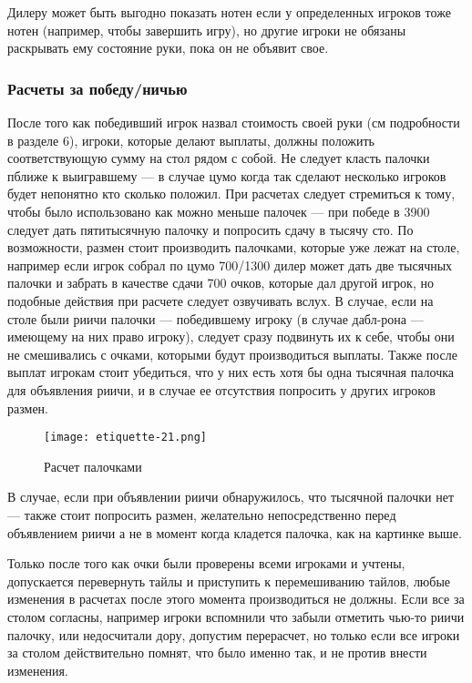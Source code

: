Дилеру может быть выгодно показать нотен если у определенных игроков тоже нотен (например, чтобы завершить игру), но другие игроки не обязаны раскрывать ему состояние руки, пока он не объявит свое.

\subsubsection{Расчеты за победу/ничью}

После того как победивший игрок назвал стоимость своей руки (см подробности в разделе 6), игроки, которые делают выплаты, должны положить соответствующую сумму на стол рядом с собой. Не следует класть палочки пближе к выигравшему --- в случае цумо когда так сделают несколько игроков будет непонятно кто сколько положил. При расчетах следует стремиться к тому, чтобы было использовано как можно меньше палочек --- при победе в 3900 следует дать пятитысячную палочку и попросить сдачу в тысячу сто. По возможности, размен стоит производить палочками, которые уже лежат на столе, например если игрок собрал по цумо 700/1300 дилер может дать две тысячных палочки и забрать в качестве сдачи 700 очков, которые дал другой игрок, но подобные действия при расчете следует озвучивать вслух. В случае, если на столе были риичи палочки --- победившему игроку (в случае дабл-рона --- имеющему на них право игроку), следует сразу подвинуть их к себе, чтобы они не смешивались с очками, которыми будут производиться выплаты. Также после выплат игрокам стоит убедиться, что у них есть хотя бы одна тысячная палочка для объявления риичи, и в случае ее отсутствия попросить у других игроков размен.

\begin{figure}[H]
	\centering
	\texttt{[image: etiquette-21.png]}
	\caption{Расчет палочками}
\end{figure}

В случае, если при объявлении риичи обнаружилось, что тысячной палочки нет --- также стоит попросить размен, желательно непосредственно перед объявлением риичи а не в момент когда кладется палочка, как на картинке выше.

Только после того как очки были проверены всеми игроками и учтены, допускается перевернуть тайлы и приступить к перемешиванию тайлов, любые изменения в расчетах после этого момента производиться не должны. Если все за столом согласны, например игроки вспомнили что забыли отметить чью-то риичи палочку, или недосчитали дору, допустим перерасчет, но только если все игроки за столом действительно помнят, что было именно так, и не против внести изменения.

